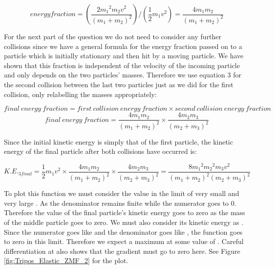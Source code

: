 \begin{problem}
{\begin{equation}energy fraction=\left(\frac{2{m_1}^2m_2v^2}{\left(m_1 + m_2\right)^2}\right)/\left(\frac{1}{2}m_1v^2\right)=\frac{4m_{1}m_{2}}{(m_{1}+m_{2})^{2}}\end{equation}

For the next part of the question we do not need to consider any further collisions since we have a general formula for the energy fraction passed on to a particle which is initially stationary and then hit by a moving particle. We have shown that this fraction is independent of the velocity of the incoming particle and only depends on the two particles' masses. Therefore we use equation 3 for the second collision between the last two particles just as we did for the first collision, only relabelling the masses appropriately:

\begin{equation*}final~energy~fraction=first~collision~energy~fraction \times second~collision~energy~fraction\end{equation*}
\begin{equation*}final~energy~fraction=\frac{4m_{1}m_{2}}{(m_{1}+m_{2})^{2}}\times \frac{4m_{2}m_{3}}{(m_{2}+m_{3})^{2}}\end{equation*}

Since the initial kinetic energy is simply that of the first particle, the kinetic energy of the final particle after both collisions have occurred is:

\begin{equation*}K.E._{3final}=\frac{1}{2}m_1v^2 \times \frac{4m_{1}m_{2}}{(m_{1}+m_{2})^{2}}\times \frac{4m_{2}m_{3}}{(m_{2}+m_{3})^{2}}=\frac{8{m_{1}}^2{m_{2}}^2m_3v^2}{(m_{1}+m_{2})^{2}(m_{2}+m_{3})^{2}}\end{equation*}

To plot this function we must consider the value in the limit of very small and very large . As  the denominator remains finite while the numerator goes to 0. Therefore the value of the final particle's kinetic energy goes to zero as the mass of the middle particle goes to zero. We must also consider its kinetic energy as . Since the numerator goes like  and the denominator goes like , the function goes to zero in this limit. Therefore we expect a maximum at some value of . Careful differentiation at  also shows that the gradient must go to zero here. See Figure \ref{fig:Tripos_Elastic_ZMF_2} for the plot. 

}
\end{problem}
